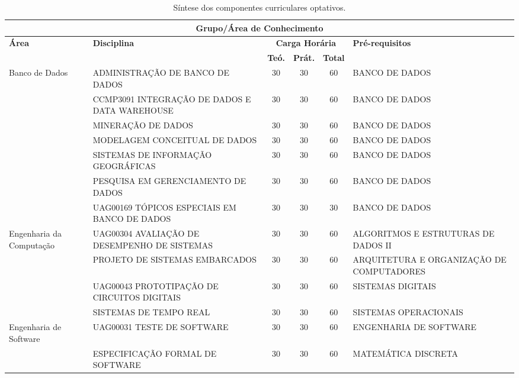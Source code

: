 \documentclass[
	12pt,				%
	openright,			%
  oneside,     %
	a4paper,			%
 hyphens,
	chapter=TITLE,		%
	english,			%
	french,				%
	spanish,			%
	brazil				%
	]{abntex2}
\begin{document}
  \begin{center}
    
    \begin{tiny}
      \begin{longtable}{p{2.5cm}p{5.5cm}cccp{3.3cm}}
        \caption{\label{quadro:sintese-componentes-curriculares-optativos}Síntese dos componentes curriculares optativos.}\\
      \toprule
      \multicolumn{6}{c}{\textbf{Grupo/Área de Conhecimento}} \\ \midrule
      \textbf{Área} & \textbf{Disciplina} & \multicolumn{3}{c}{\textbf{Carga Horária}} & \textbf{Pré-requisitos} \\
      & & \textbf{Teó.} & \textbf{Prát.} & \textbf{Total} & \\
      \midrule
    Banco de Dados & ADMINISTRAÇÃO DE BANCO DE DADOS & 30 & 30 & 60 & BANCO DE DADOS \\ \cline{2-6}
      & CCMP3091 INTEGRAÇÃO DE DADOS E DATA WAREHOUSE & 30 & 30 & 60 & BANCO DE DADOS \\ \cline{2-6}
      & MINERAÇÃO DE DADOS & 30 & 30 & 60 & BANCO DE DADOS \\ \cline{2-6}
      & MODELAGEM CONCEITUAL DE DADOS & 30 & 30 & 60 & BANCO DE DADOS \\ \cline{2-6}
      & SISTEMAS DE INFORMAÇÃO GEOGRÁFICAS & 30 & 30 & 60 & BANCO DE DADOS \\ \cline{2-6}
      & PESQUISA EM GERENCIAMENTO DE DADOS & 30 & 30 & 60 & BANCO DE DADOS \\ \cline{2-6}
      & UAG00169 TÓPICOS ESPECIAIS EM BANCO DE DADOS & 30 & 30 & 30 & BANCO DE DADOS \\ \midrule
    Engenharia da Computação & UAG00304 AVALIAÇÃO DE DESEMPENHO DE SISTEMAS & 30 & 30 & 60 & ALGORITMOS E ESTRUTURAS DE DADOS II \\ \cline{2-6}
      & PROJETO DE SISTEMAS EMBARCADOS & 30 & 30 & 60 & ARQUITETURA E ORGANIZAÇÃO DE COMPUTADORES \\ \cline{2-6}
      & UAG00043 PROTOTIPAÇÃO DE CIRCUITOS DIGITAIS & 30 & 30 & 60 & SISTEMAS DIGITAIS \\ \cline{2-6}
      & SISTEMAS DE TEMPO REAL & 30 & 30 & 60 & SISTEMAS OPERACIONAIS \\ \midrule
      Engenharia de Software & UAG00031 TESTE DE SOFTWARE & 30 & 30 & 60 & ENGENHARIA DE SOFTWARE \\ \cline{2-6}
      & ESPECIFICAÇÃO FORMAL DE SOFTWARE & 30 & 30 & 60 & MATEMÁTICA DISCRETA \\ \cline{2-6}

\end{longtable}
\end{tiny}
\end{center}
\end{document}

